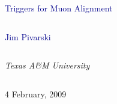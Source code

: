 \documentclass[compress]{beamer}
\begin{document}
\begin{frame}
\vfill
\begin{center}
\textcolor{darkblue}{\Large Triggers for Muon Alignment}

\vfill
\begin{columns}
\begin{center}
\large
\textcolor{darkblue}{Jim Pivarski}
\end{center}
\end{columns}

\begin{columns}
\begin{center}
\scriptsize
{\it Texas A\&M University}
\end{center}
\end{columns}

\vfill
 4 February, 2009

\end{center}
\end{frame}


\small
\end{document}
